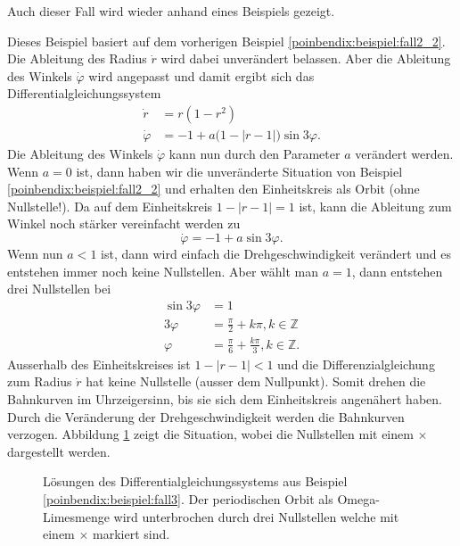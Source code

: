 Auch dieser Fall wird wieder anhand eines Beispiels gezeigt.

\begin{beispiel} \label{poinbendix:beispiel:fall3}

Dieses Beispiel basiert auf dem vorherigen Beispiel \ref{poinbendix:beispiel:fall2_2}.
Die Ableitung des Radius $\dot{r}$ wird dabei unverändert belassen.
Aber die Ableitung des Winkels $\dot{\varphi}$ wird angepasst und damit ergibt sich das Differentialgleichungssystem
\begin{align*}
    \dot{r}       &= r(1-r^2) \\
    \dot{\varphi} &= -1 + a\big(1 - |r - 1|\big) \sin 3\varphi.
\end{align*}
Die Ableitung des Winkels $\dot{\varphi}$ kann nun durch den Parameter $a$ verändert werden.
Wenn $a=0$ ist, dann haben wir die unveränderte Situation von Beispiel \ref{poinbendix:beispiel:fall2_2} und erhalten den Einheitskreis als Orbit (ohne Nullstelle!).
Da auf dem Einheitskreis $1 - |r-1|=1$ ist, kann die Ableitung zum Winkel noch stärker vereinfacht werden zu
\begin{equation*}
    \dot{\varphi} = -1 + a \sin 3\varphi.
\end{equation*}
Wenn nun $a<1$ ist, dann wird einfach die Drehgeschwindigkeit verändert und es entstehen immer noch keine Nullstellen.
Aber wählt man $a=1$, dann entstehen drei Nullstellen bei
\begin{align*}
    \sin 3\varphi &= 1 \\
    3\varphi &= \frac{\pi}{2} + k\pi, k \in \mathbb{Z} \\
    \varphi &= \frac{\pi}{6} + \frac{k\pi}{3}, k \in \mathbb{Z}.
\end{align*}
Ausserhalb des Einheitskreises ist $1 - |r-1|<1$ und die Differenzialgleichung zum Radius $\dot{r}$ hat keine Nullstelle (ausser dem Nullpunkt).
Somit drehen die Bahnkurven im Uhrzeigersinn, bis sie sich dem Einheitskreis angenähert haben.
Durch die Veränderung der Drehgeschwindigkeit werden die Bahnkurven verzogen.
Abbildung \ref{poinbendix:fig:fall_3} zeigt die Situation, wobei die Nullstellen mit einem $\times$ dargestellt werden.
\end{beispiel}

\begin{figure}
\centering
    
    \caption{Lösungen des Differentialgleichungssystems aus Beispiel \ref{poinbendix:beispiel:fall3}.
    Der periodischen Orbit als Omega-Limesmenge wird unterbrochen durch drei Nullstellen welche mit einem $\times$ markiert sind.}
\label{poinbendix:fig:fall_3}
\end{figure}
